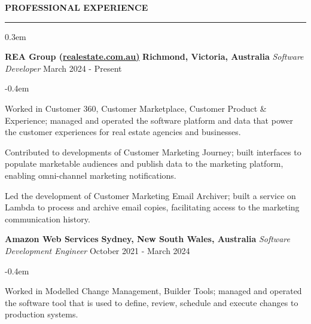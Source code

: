 \documentclass{cv}
\begin{document}
\medskip


 \textbf{\uppercase{Professional Experience}}
\sectionlineskip
\hrule
\begin{list}{}{\setlength{\leftmargin}{0em}}
\itemsep 0.3em
\item
    \textbf{REA Group (\href{https://realestate.com.au/}{realestate.com.au)}} \hfill \textbf{Richmond, Victoria, Australia}%
    \vspace{0.1em} \newline 
    {\textit{Software Developer}} \hfill {March 2024 - Present}%
    \begin{list}{\raisebox{0.2em}{\tiny$\bullet$} \hspace{0em}}{\setlength{\leftmargin}{2.0em}}
        \itemsep -0.4em \vspace{-0.4em}
        \item Worked in Customer 360, Customer Marketplace, Customer Product \& Experience; managed and operated the software platform and data that power the customer experiences for real estate agencies and businesses.
        \item Contributed to developments of Customer Marketing Journey; built interfaces to populate marketable audiences and publish data to the marketing platform, enabling omni-channel marketing notifications.
        \item Led the development of Customer Marketing Email Archiver; built a service on Lambda to process and archive email copies, facilitating access to the marketing communication history.
    \end{list}
\item 
    \textbf{Amazon Web Services} \hfill \textbf{Sydney, New South Wales, Australia}%
    \vspace{0.1em} \newline 
    {\textit{Software Development Engineer}} \hfill {October 2021 - March 2024}%
    \begin{list}{\raisebox{0.2em}{\tiny$\bullet$} \hspace{0em}}{\setlength{\leftmargin}{2.0em}}
        \itemsep -0.4em \vspace{-0.4em}
        \item Worked in Modelled Change Management, Builder Tools; managed and operated the software tool that is used to define, review, schedule and execute changes to production systems.

\end{list}
\end{list}
\end{document}
